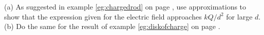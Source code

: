         (a) As suggested in example \ref{eg:chargedrod} on page \pageref{eg:chargedrod},
        use approximations to show that the expression given for the
        electric field approaches $kQ/d^2$ for large $d$.\hwendpart
        (b) Do the same for the result of example \ref{eg:diskofcharge}
        on page \pageref{eg:diskofcharge}.
